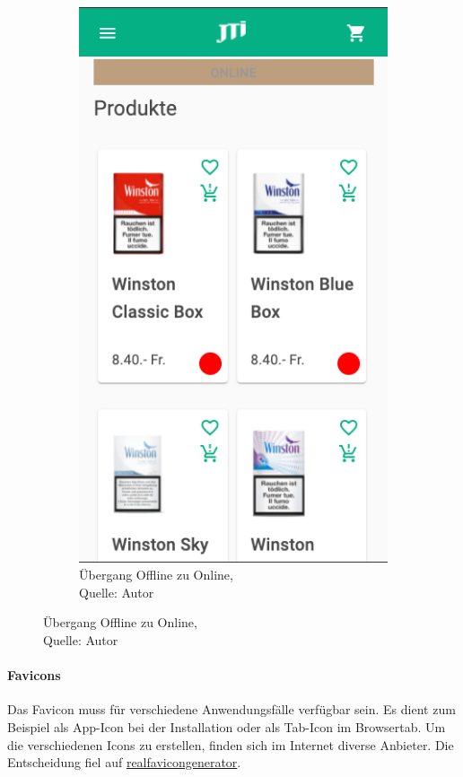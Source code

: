 \begin{figure}[H]
\begin{subfigure}[b]{0.5\textwidth}
		\includegraphics[scale=0.5]{images/backOnline.PNG}
		\caption[Übergang Offline zu Online]{Übergang Offline zu Online,\\ Quelle: Autor}
		\label{img: offlineOnline}
	\end{subfigure}
\end{figure} 
\paragraph{Favicons}
Das Favicon muss für verschiedene Anwendungsfälle verfügbar sein. Es dient zum Beispiel als App-Icon bei der Installation oder als Tab-Icon im Browsertab. Um die verschiedenen Icons zu erstellen, finden sich im Internet diverse Anbieter. Die Entscheidung fiel auf \href{https://realfavicongenerator.net/}{realfavicongenerator}. 

